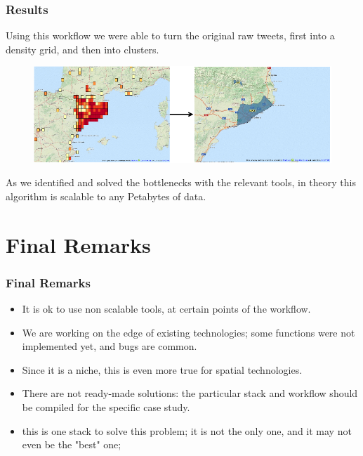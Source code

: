 \documentclass[hyperref={pdfpagelabels=true}]{beamer}
\begin{document}
\begin{frame}
\frametitle{Results}
Using this workflow we were able to turn the original raw tweets, first into a density grid, and then into clusters.
      \begin{figure}   
      \includegraphics[width=\textwidth]{geo4.png}   
     \end{figure}
As we identified and solved the bottlenecks with the relevant tools, in theory this algorithm is scalable to any Petabytes of data.%
\end{frame}

\section{Final Remarks}
\begin{frame}
\frametitle{Final Remarks}
    \begin{itemize}    
      \item<2->It is ok to use non scalable tools, at certain points of the workflow.
      \item<3->We are working on the edge of existing technologies; some functions were not implemented yet, and bugs are common.
      \item<4->Since it is a niche, this is even more true for spatial technologies.
      \item<5->There are not ready-made solutions: the particular stack and workflow should be compiled for the specific case study.
      \item<6->this is one stack to solve this problem; it is not the only one, and it may not even be the "best" one;%
     \end{itemize}
\end{frame}
\end{document}
